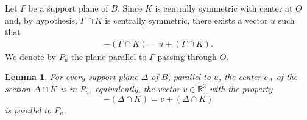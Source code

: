 \documentclass[12pt]{amsart}
\newcommand{\Rt}{\mathbb{R}^3}
\newtheorem{lemma}{Lemma}
\begin{document}
                  Let $\Gamma$ be a support plane of $B$. Since $K$ is  centrally 
                  symmetric with center at $O$ and, by hypothesis, $\Gamma \cap K$ is centrally 
                  symmetric, there exists a vector $u$ such that
\begin{eqnarray}\label{delicia}
                 -(\Gamma\cap K)=u+(\Gamma\cap K).
\end{eqnarray}
                   We denote by $P_u$ the plane parallel to $\Gamma$ passing through $O$.
\begin{lemma}\label{gato} 
                   For every support plane $\Delta$ of $B$, parallel to $u$, the center $c_\Delta$ of the 
                    section $\Delta \cap K$ is in $P_u$, equivalently, the vector $v\in \Rt$ with the property 
\[
                   -(\Delta \cap K)=v+(\Delta \cap K)
\]
                   is parallel to $P_u$.  
\end{lemma}
\end{document}
